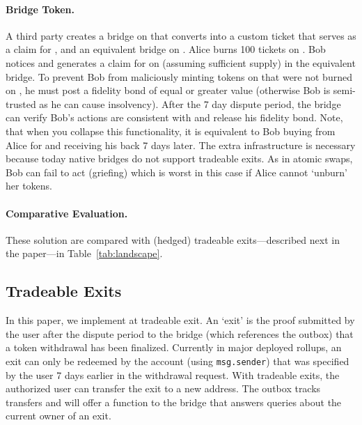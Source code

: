 \paragraph{Bridge Token.} A third party creates a bridge on \layertwo that converts \ethtwo into a custom ticket that serves as a claim for \ethtwo, and an equivalent bridge on \layerone. Alice burns 100 tickets on \layertwo. Bob notices and generates a claim for \ethone on \layerone (assuming sufficient supply) in the equivalent \layerone bridge. To prevent Bob from maliciously minting tokens on \layerone that were not burned on \layertwo, he must post a fidelity bond of equal or greater value (otherwise Bob is semi-trusted as he can cause insolvency). After the 7 day dispute period, the \layerone bridge can verify Bob's actions are consistent with \layertwo and release his fidelity bond. Note, that when you collapse this functionality, it is equivalent to Bob buying \ethxx from Alice for \ethone and receiving his \ethone back 7 days later. The extra infrastructure is necessary because today native bridges do not support tradeable exits. As in atomic swaps, Bob can fail to act (griefing) which is worst in this case if Alice cannot `unburn' her tokens.

\paragraph{Comparative Evaluation.} These solution are compared with (hedged) tradeable exits---described next in the paper---in Table~\ref{tab:landscape}.
 

\subsection{Tradeable Exits} 
\label{sec:tradeablexits}

In this paper, we implement at tradeable exit. An `exit' is the proof submitted by the user after the dispute period to the bridge (which references the outbox) that a token withdrawal has been finalized. Currently in major deployed rollups, an exit can only be redeemed by the account (\ie using \texttt{msg.sender}) that was specified by the user 7 days earlier in the \layertwo withdrawal request. With tradeable exits, the authorized user can transfer the exit to a new address. The outbox tracks transfers and will offer a function to the bridge that answers queries about the current owner of an exit.

